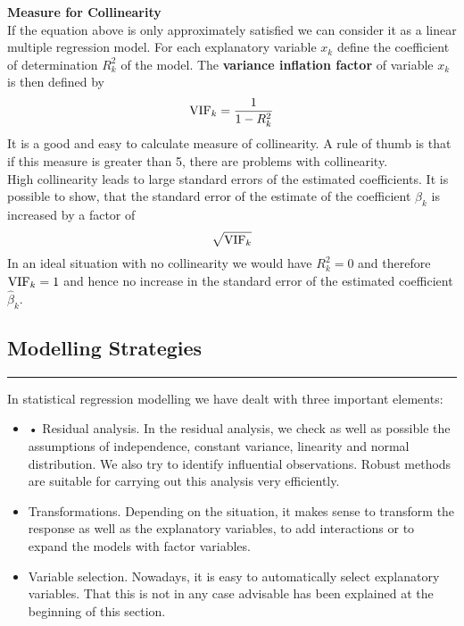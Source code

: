 \textbf{Measure for Collinearity}\\
If the equation above is only approximately satisfied we can consider it as a linear multiple regression model. For each explanatory variable $x_k$ define the coefficient of determination $R^2_k$ of the model. The \textbf{variance inflation factor} of variable $x_k$ is then defined by
\begin{equation}
  \textup{VIF}_k = \frac{1}{1-R^2_k}
\end{equation}
It is a good and easy to calculate measure of collinearity. A rule of thumb is that if this measure is greater than 5, there are problems with collinearity.\\
High collinearity leads to large standard errors of the estimated coefficients. It is possible to show, that the standard error of the estimate of the coefficient $\beta_k$ is increased by a factor of
\begin{equation}
  \sqrt{\textup{VIF}_k}
\end{equation}
In an ideal situation with no collinearity we would have $R^2_k = 0$ and therefore $\textup{VIF}_k = 1$ and hence no increase in the standard error of the estimated coefficient $\hat{\beta}_k$.

\subsection{Modelling Strategies}
\noindent\rule[\linienAbstand]{\linewidth}{\linienDicke}
In statistical regression modelling we have dealt with three important elements:
\begin{itemize}
  \item • Residual analysis. In the residual analysis, we check as well as possible the assumptions of independence, constant variance, linearity and normal distribution. We also try to identify influential observations. Robust methods are suitable for carrying out this analysis very efficiently.
  \item Transformations. Depending on the situation, it makes sense to transform the response as well as the explanatory variables, to add interactions or to expand the models with factor variables.
  \item Variable selection. Nowadays, it is easy to automatically select explanatory variables. That this is not in any case advisable has been explained at the beginning of this section.
\end{itemize}

